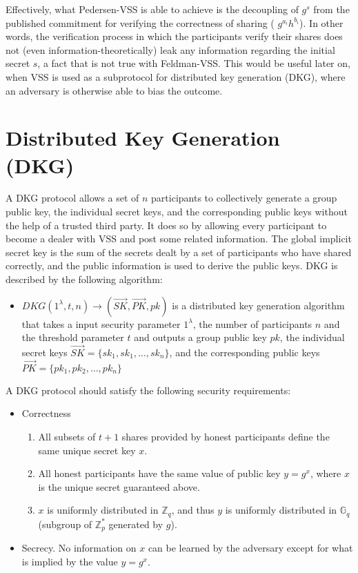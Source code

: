 \documentclass[letterpaper,twocolumn,10pt]{article}
\theoremstyle{definition}
\theoremstyle{remark}
\begin{document}
Effectively, what Pedersen-VSS is able to achieve is the decoupling of $g^{s}$ from the published commitment for verifying the correctness of sharing ( $g^{a_i} h^{b_i}$). In other words, the verification process in which the participants verify their shares does not (even information-theoretically) leak any information regarding the initial secret $s$, a fact that is not true with Feldman-VSS. This would be useful later on, when VSS is used as a subprotocol for distributed key generation (DKG), where an adversary is otherwise able to bias the outcome.

\section{Distributed Key Generation (DKG)}
\label{appendix:dkg}
A DKG protocol allows a set of $n$ participants to collectively generate a group public key, the individual secret keys, and the corresponding public keys without the help of a trusted third party. It does so by allowing every participant to become a dealer with VSS and post some related information. The global implicit secret key is the sum of the secrets dealt by a set of participants who have shared correctly, and the public information is used to derive the public keys. DKG is described by the following algorithm:
\begin{itemize}
    \item $DKG(1^{\lambda}, t, n) \rightarrow (\vec{SK}, \vec{PK}, pk)$ is a distributed key generation algorithm that takes a input security parameter $1^\lambda$, the number of participants $n$ and the threshold parameter $t$ and outputs a group public key $pk$, the individual secret keys $\vec{SK} = \{sk_1, sk_1, \ldots, sk_n\}$, and the corresponding public keys $\vec{PK} = \{pk_1, pk_2, \ldots, pk_n\}$
\end{itemize}

A DKG protocol should satisfy the following security requirements:
\begin{itemize}
    \item Correctness
        \begin{enumerate}
        \item All subsets of $t+1$ shares provided by honest participants define the same unique secret key $x$.
        \item All honest participants have the same value of public key $y=g^x$, where $x$ is the unique secret guaranteed above.
        \item $x$ is uniformly distributed in $\mathbb{Z}_q$, and thus $y$ is uniformly distributed in $\mathbb{G}_q$ (subgroup of $\mathbb{Z}^*_p$ generated by $g$).
        \end{enumerate}
        
    \item Secrecy. No information on $x$ can be learned by the adversary except for what is implied by the value $y = g^x$.
\end{itemize}
\end{document}
